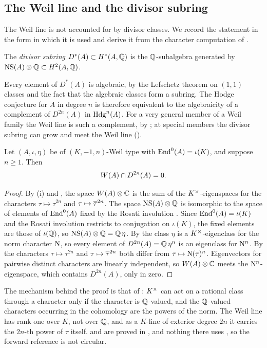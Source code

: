 \subsection{The Weil line and the divisor subring}

The Weil line is not accounted for by divisor classes. We record the
statement in the form in which it is used and derive it from the character
computation of .

\begin{definition}\label{def:divisorsubring}
The \emph{divisor subring} $D^{*}(A)\subset H^{*}(A,\mathbb{Q})$ is the
$\mathbb{Q}$-subalgebra generated by $\mathrm{NS}(A)\otimes\mathbb{Q}\subset H^{2}(A,\mathbb{Q})$.
\end{definition}

Every element of $D^{*}(A)$ is algebraic, by the Lefschetz theorem on $(1,1)$
classes and the fact that the algebraic classes form a subring. The Hodge
conjecture for $A$ in degree $n$ is therefore equivalent to the algebraicity
of a complement of $D^{2n}(A)$ in $\mathrm{Hdg}^{n}(A)$. For a very general member of
a Weil family the Weil line is such a complement, by ; at
special members the divisor subring can grow and meet the Weil line
().

\begin{proposition}\label{prop:notpoly}
Let $(A,\iota,\eta)$ be of $(K,-1,n)$-Weil type with
$\operatorname{End}^{0}(A)=\iota(K)$, and suppose $n\ge1$. Then
\[
  W(A)\cap D^{2n}(A)=0 .
\]
\end{proposition}

\begin{proof}
By (i) and , the space
$W(A)\otimes\mathbb{C}$ is the sum of the $K^{\times}$-eigenspaces for the characters
$\tau\mapsto\tau^{2n}$ and $\tau\mapsto\overline{\tau}^{2n}$. The space
$\mathrm{NS}(A)\otimes\mathbb{Q}$ is isomorphic to the space of elements of $\operatorname{End}^{0}(A)$
fixed by the Rosati involution \cite[Section~5.2]{BL04}. Since
$\operatorname{End}^{0}(A)=\iota(K)$ and the Rosati involution restricts to conjugation on
$\iota(K)$, the fixed elements are those of $\iota(\mathbb{Q})$, so
$\mathrm{NS}(A)\otimes\mathbb{Q}=\mathbb{Q}\,\eta$. By  the class $\eta$ is a
$K^{\times}$-eigenclass for the norm character $\mathrm{N}$, so every element of
$D^{2n}(A)=\mathbb{Q}\,\eta^{n}$ is an eigenclass for $\mathrm{N}^{n}$. By
 the characters $\tau\mapsto\tau^{2n}$ and
$\tau\mapsto\overline{\tau}^{2n}$ both differ from $\tau\mapsto\mathrm{N}(\tau)^{n}$.
Eigenvectors for pairwise distinct characters are linearly independent, so
$W(A)\otimes\mathbb{C}$ meets the $\mathrm{N}^{n}$-eigenspace, which contains
$D^{2n}(A)$, only in zero.
\end{proof}

The mechanism behind the proof is that of : $K^{\times}$
can act on a rational class through a character only if the character is
$\mathbb{Q}$-valued, and the $\mathbb{Q}$-valued characters occurring in the cohomology
are the powers of the norm. The Weil line has rank one over $K$, not over $\mathbb{Q}$, and as a
$K$-line of exterior degree $2n$ it carries the $2n$-th power of $\tau$
itself.  and  are proved
in , and nothing there uses , so the
forward reference is not circular.
